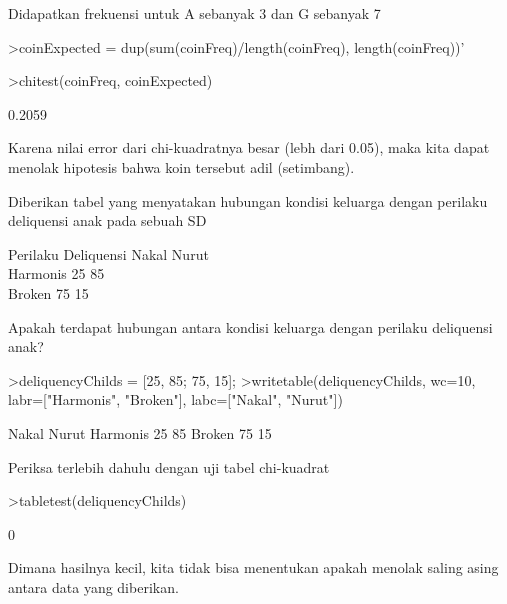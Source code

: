 \documentclass[a4paper,10pt]{article}
\begin{document}
\begin{eulernotebook}
\begin{eulercomment}
\begin{eulercomment}
\begin{eulercomment}
\begin{eulercomment}
\begin{eulercomment}
\begin{eulercomment}
\begin{eulercomment}
Didapatkan frekuensi untuk A sebanyak 3 dan G sebanyak 7
\end{eulercomment}
\begin{eulerprompt}
>coinExpected = dup(sum(coinFreq)/length(coinFreq), length(coinFreq))'
\end{eulerprompt}
\begin{euleroutput}
  [5,  5]
\end{euleroutput}
\begin{eulerprompt}
>chitest(coinFreq, coinExpected)
\end{eulerprompt}
\begin{euleroutput}
  0.2059
\end{euleroutput}
\begin{eulercomment}
Karena nilai error dari chi-kuadratnya besar (lebh dari 0.05), maka
kita dapat menolak hipotesis bahwa koin tersebut adil (setimbang).
\end{eulercomment}
\begin{eulercomment}
Diberikan tabel yang menyatakan hubungan kondisi keluarga dengan
perilaku deliquensi anak pada sebuah SD

Perilaku Deliquensi \textbar{} Nakal \textbar{} Nurut\\
Harmonis            \textbar{} 25    \textbar{} 85\\
Broken              \textbar{} 75    \textbar{} 15

Apakah terdapat hubungan antara kondisi keluarga dengan perilaku
deliquensi anak?
\end{eulercomment}
\begin{eulerprompt}
>deliquencyChilds = [25, 85; 75, 15];
>writetable(deliquencyChilds, wc=10, labr=["Harmonis", "Broken"], labc=["Nakal", "Nurut"])
\end{eulerprompt}
\begin{euleroutput}
                 Nakal     Nurut
    Harmonis        25        85
      Broken        75        15
\end{euleroutput}
\begin{eulercomment}
Periksa terlebih dahulu dengan uji tabel chi-kuadrat
\end{eulercomment}
\begin{eulerprompt}
>tabletest(deliquencyChilds)
\end{eulerprompt}
\begin{euleroutput}
  0
\end{euleroutput}
\begin{eulercomment}
Dimana hasilnya kecil, kita tidak bisa menentukan apakah menolak
saling asing antara data yang diberikan.


\end{eulercomment}
\end{eulercomment}
\end{eulercomment}
\end{eulercomment}
\end{eulercomment}
\end{eulercomment}
\end{eulercomment}
\end{eulernotebook}
\end{document}

